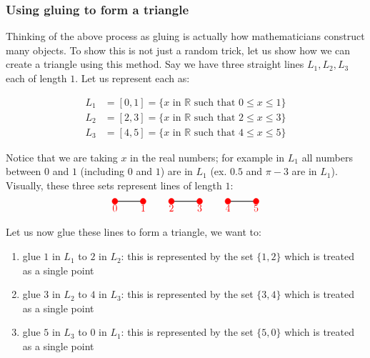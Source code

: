 \documentclass{article}
\newcommand{\R}{{\mathbb{R}}}
\begin{document}
\subsubsection*{Using gluing to form a triangle}

Thinking of the above process as gluing is actually how mathematicians construct many objects. To show
this is not just a random trick, let us show how we can create a triangle using this method. Say we have three
straight lines $L_1, L_2, L_3$ each of length $1$. Let us represent each as:

\begin{align*}
  L_1 &= [0,1] = \{x\text{ in }\R\text{ such that $0\le x \le 1$}\}\\
  L_2 &= [2,3] = \{x\text{ in }\R\text{ such that $2\le x \le 3$}\}\\
  L_3 &= [4,5] = \{x\text{ in }\R\text{ such that $4\le x \le 5$}\}
\end{align*}

Notice that we are taking $x$ in the real numbers; for example in $L_1$ all numbers between $0$ and $1$
(including $0$ and $1$) are in $L_1$ (ex. $0.5$ and  $\pi-3$ are in $L_1$). Visually, these three sets
represent lines of length $1$:
\[
\begin{tikzpicture}

  \draw[thick] (0,0) -- (1,0);
  \draw[red, fill=red] (0,0) circle (0.1) node[below] {0};
  \draw[red, fill=red] (1,0) circle (0.1) node[below] {1};

  \draw[thick] (2,0) -- (3,0);
  \draw[red, fill=red] (2,0) circle (0.1) node[below] {2};
  \draw[red, fill=red] (3,0) circle (0.1) node[below] {3};

  \draw[thick] (4,0) -- (5,0);
  \draw[red, fill=red] (4,0) circle (0.1) node[below] {4};
  \draw[red, fill=red] (5,0) circle (0.1) node[below] {5};
\end{tikzpicture}
\]
Let us now glue these lines to form a triangle, we want to:
\begin{enumerate}
  \item glue $1$ in $L_1$ to $2$ in $L_2$: this is represented by the set $\{1,2\}$ which is treated as a single
    point
  \item glue $3$ in $L_2$ to $4$ in $L_3$: this is represented by the set $\{3,4\}$ which is treated as a single
    point
  \item glue $5$ in $L_3$ to $0$ in $L_1$: this is represented by the set $\{5,0\}$ which is treated as a single
    point
\end{enumerate}
\end{document}
